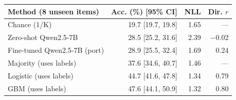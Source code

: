 \setlength{\tabcolsep}{3pt}
\begin{tabular}{@{}lrrr@{}}
\toprule
\textbf{Method (8 unseen items)} & \textbf{Acc. (\%)} [95\% CI] & \textbf{NLL} & \textbf{Dir. $r$} \\
\midrule
Chance (1/K) & 19.7 [19.7, 19.8] & 1.65 & --- \\
Zero-shot Qwen2.5-7B & 28.5 [25.2, 31.6] & 2.39 & $-$0.02 \\
Fine-tuned Qwen2.5-7B (port) & 28.9 [25.5, 32.4] & 1.69 & 0.24 \\
Majority (uses labels) & 37.6 [34.6, 40.7] & 1.46 & --- \\
Logistic (uses labels) & 44.7 [41.6, 47.8] & 1.34 & 0.79 \\
GBM (uses labels) & 47.6 [44.1, 50.9] & 1.32 & 0.80 \\
\bottomrule
\end{tabular}